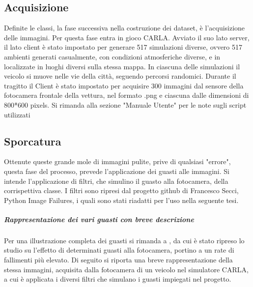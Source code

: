 \documentclass[14pt]{extarticle}
\begin{document}
\subsection{Acquisizione}
Definite le classi, la fase successiva nella costruzione dei dataset, è l'acquisizione delle immagini.
Per questa fase entra in gioco CARLA. Avviato il suo lato server, il lato client è stato impostato per generare 517 simulazioni diverse, ovvero 517 ambienti generati casualmente, con condizioni atmosferiche diverse, e in localizzate in luoghi diversi sulla stessa mappa. In ciascuna delle simulazioni il veicolo si muove nelle vie della città, seguendo percorsi randomici. Durante il tragitto il Client è stato impostato per acquisire 300 immagini dal sensore della fotocamera frontale della vettura, nel formato .png e ciascuna dalle  dimensioni di 800*600 pixels.
Si rimanda alla sezione "Manuale Utente" per le note sugli script utilizzati

\subsection{Sporcatura}
Ottenute queste grande mole di immagini pulite, prive di qualsiasi "errore", questa fase del processo, prevede l'applicazione dei guasti alle immagini.
Si intende l'applicazione di filtri, che simulino il guasto alla fotocamera, della corrispettiva classe.
I filtri sono ripresi dal progetto github di Francesco Secci, Python Image Failures, i quali sono stati riadatti per l'uso nella seguente tesi.
\subparagraph{Rappresentazione dei vari guasti con breve descrizione}
Per una illustrazione completa dei guasti si rimanda  a \cite{secci2020failures}, da cui è stato ripreso lo studio su l'effetto di determinati guasti alla fotocamera, portino a un rate di fallimenti più elevato. 
Di seguito si riporta una breve rappresentazione della stessa immagini, acquisita dalla fotocamera di un veicolo nel simulatore CARLA, a cui è applicata i diversi filtri che simulano i guasti impiegati nel progetto.
\end{document}
